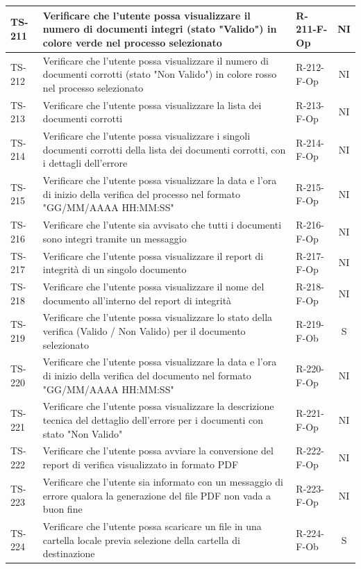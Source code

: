 \documentclass[a4paper,12pt]{article}
\begin{document}
\begin{longtable}{|p{1.5cm}|p{8.3cm}|p{2.4cm}|c|}
\hline
TS-211 & Verificare che l'utente possa visualizzare il numero di documenti integri (stato "Valido") in colore verde nel processo selezionato & R-211-F-Op & NI \\
\hline
TS-212 & Verificare che l'utente possa visualizzare il numero di documenti corrotti (stato "Non Valido") in colore rosso nel processo selezionato & R-212-F-Op & NI \\
\hline
TS-213 & Verificare che l'utente possa visualizzare la lista dei documenti corrotti & R-213-F-Op & NI \\
\hline
TS-214 & Verificare che l'utente possa visualizzare i singoli documenti corrotti della lista dei documenti corrotti, con i dettagli dell'errore & R-214-F-Op & NI \\
\hline
TS-215 & Verificare che l'utente possa visualizzare la data e l'ora di inizio della verifica del processo nel formato "GG/MM/AAAA HH:MM:SS" & R-215-F-Op & NI \\
\hline
TS-216 & Verificare che l'utente sia avvisato che tutti i documenti sono integri tramite un messaggio & R-216-F-Op & NI \\
\hline
TS-217 & Verificare che l'utente possa visualizzare il report di integrità di un singolo documento & R-217-F-Op & NI \\
\hline
TS-218 & Verificare che l'utente possa visualizzare il nome del documento all'interno del report di integrità & R-218-F-Op & NI \\
\hline
TS-219 & Verificare che l'utente possa visualizzare lo stato della verifica (Valido / Non Valido) per il documento selezionato & R-219-F-Ob & S \\
\hline
TS-220 & Verificare che l'utente possa visualizzare la data e l'ora di inizio della verifica del documento nel formato "GG/MM/AAAA HH:MM:SS" & R-220-F-Op & NI \\
\hline
TS-221 & Verificare che l'utente possa visualizzare la descrizione tecnica del dettaglio dell'errore per i documenti con stato "Non Valido" & R-221-F-Op & NI \\
\hline
TS-222 & Verificare che l'utente possa avviare la conversione del report di verifica visualizzato in formato PDF & R-222-F-Op & NI \\
\hline
TS-223 & Verificare che l'utente sia informato con un messaggio di errore qualora la generazione del file PDF non vada a buon fine & R-223-F-Op & NI \\
\hline
TS-224 & Verificare che l'utente possa scaricare un file in una cartella locale previa selezione della cartella di destinazione & R-224-F-Ob & S \\

\end{longtable}
\end{document}
